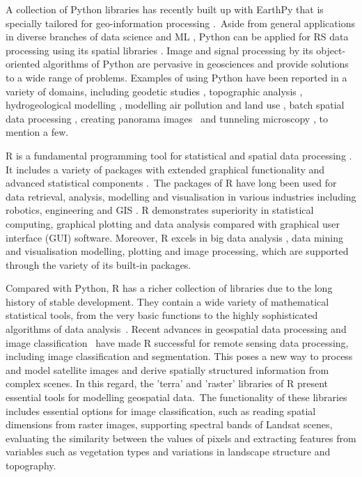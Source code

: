 \documentclass[jimaging,article,accept,pdftex,moreauthors]{Definitions/mdpi}
\begin{document}
A collection of Python libraries \cite{ROBERTS2022105192,CHEN2022105362} has recently built up with EarthPy that is specially tailored for{ }geo-information processing \cite{wasser2019EarthPyAP}.~Aside from general applications in {diverse branches of }data science and ML \cite{8757088,DebeirDecaestecker,Debeir2008,9719489}, Python can be applied for {RS data processing using its spatial libraries} \cite{Ahmed}. Image and signal processing by {its} object-oriented algorithms of Python are pervasive in geosciences and provide solutions to a wide range of problems{. }Examples of using Python have been reported {in a variety of domains, including} geodetic studies \cite{Zhou2021GPS2spaceAO}, topographic analysis \cite{9254627}, hydrogeological modelling \cite{Mogaji}, modelling air pollution and land use \cite{Maetal2020}, batch spatial data processing \cite{6057428}, creating panorama images~\cite{JASKOLKA2019e02560} and tunneling microscopy \cite{BASTIDAS2021150821}, {to mention a few}. 

{R }is a fundamental programming tool for {statistical and }spatial data processing \cite{RCoreTeam}. It { includes a} variety of packages{ with extended} graphical functionality{ and advanced} statistical components \cite{Murrell}.~The packages of R have long been used for data retrieval, analysis, modelling and visualisation in various industries including robotics, engineering and GIS \cite{7847824,Lemenkova2022a,9378399,Lemenkova202216,9390011}. R demonstrates{ }superiority in statistical computing, {graphical plotting and data analysis compared with} graphical user interface (GUI) software. {Moreover, R} excels in big data analysis \cite{7570960,9752002,6597171}, data mining \cite{7978404} and visualisation \cite{Lemenkova201991}{ }modelling, plotting{ and image processing, which are }supported through the variety of its built-in packages. 

{Compared} with Python, R has a{ }richer collection of libraries{ due to the }long history of stable development{. They contain} a wide variety of mathematical statistical tools, from the very basic functions to the highly sophisticated algorithms of data analysis~\cite{9675988}. {Recent} advances in geospatial data processing \cite{8226275} and image classification~\cite{9844952,8117873} have made R successful for remote sensing data processing, including image classification and segmentation. This poses a new way to process and model satellite images and derive spatially structured information from complex scenes. {In this regard, the 'terra' and 'raster' libraries of R present essential tools for }modelling geospatial {data.~The functionality of these libraries includes essential options for image classification, such as reading spatial dimensions from raster images, supporting spectral bands of Landsat scenes, evaluating the} similarity between {the values of pixels and extracting features from variables such as} vegetation types and variations in landscape structure and topography. 
\end{document}
